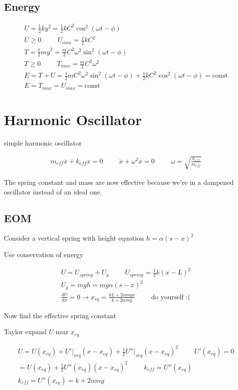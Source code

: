 \documentclass[fleqn]{report}
\newcommand{\hp}{\hspace{1cm}}
\newcommand{\const}{\textrm{const}}
\newcommand{\equations} [1] {
\begin{gather*}
#1
\end{gather*}
}
\begin{document}
\subsection{Energy}
\equations{
    U = \frac{1}{2} k y^2 = \frac{1}{2} kC^2 \cos^2(\omega t - \phi)
    \\
    U \geq 0 
    \hp 
    U_{max} = \frac{1}{2} kC^2
    \\
    T = \frac{1}{2} m \dot y^2 
    =
    \frac{m}{2} C^2 \omega^2 \sin^2(\omega t - \phi)
    \\
    T \geq 0 \hp T_{max} = \frac{m}{2} C^2 \omega^2
    \\
    E = T + U = 
    \frac{1}{2} mC^2 \omega^2 \sin^2(\omega t - \phi)
    +
    \frac{1}{2} k C^2 \cos^2(\omega t - \phi)
    =
    \const
    \\
    E = T_{max} = U_{max} = \const
}

\section{Harmonic Oscillator}

simple harmonic oscillator
\equations{
    m_{eff} \ddot x + k_{eff}x = 0
    \hp 
    \ddot x + \omega^2 x = 0
    \hp 
    \omega = \sqrt{\frac{k_{eff}}{m_{eff}}}
}

The spring constant and mass are now effective because we're in a dampened oscillator instead of an ideal one. 

\subsection{EOM}
Consider a vertical spring with height equation $h = \alpha (s - x)^2$

Use conservation of energy 

\equations{
    U = U_{spring} + U_{g}
    \hp 
    U_{spring} = \frac{1}{2} k (x - L)^2
    \\
    U_g = mgh = mg \alpha (s - x)^2
    \\
    \frac{dU}{dx} = 0
    \rightarrow 
    x_{eq} = \frac{kL + 2 \alpha m g s}{k + 2 \alpha mg}
    \hp 
    \textrm{do yourself :(}
}

Now find the effective spring constant

Taylor expand $U$ near $x_{eq}$

\equations{
    U = U(x_{eq}) + U' \Big|_{xeq} (x - x_{eq}) + \frac{1}{2} U'' \Big|_{xeq} (x - x_{eq})^2
    \hp 
    U'(x_{eq}) = 0
    \\
    =
    U(x_{eq}) + \frac{1}{2} U''(x_{eq}) (x - x_{eq})^2
    \hp 
    k_{eff} = U''(x_{eq})
    \\
    k_{eff} = U''(x_{eq}) = k + 2 \alpha mg 
}
\end{document}
